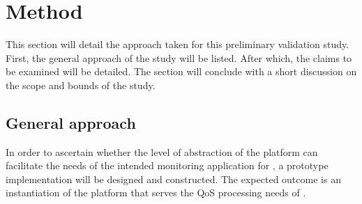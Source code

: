
	
\section{Method}
\label{sec:val:method}
This section will detail the approach taken for this preliminary validation study. First, the general approach of the study will be listed. After which, the claims to be examined will be detailed. The section will conclude with a short discussion on the scope and bounds of the study.
\subsection{General approach} 
In order to ascertain whether the level of abstraction of the platform can facilitate the needs of the intended monitoring application for \sensitnospace, a prototype implementation will be designed and constructed. The expected outcome is an instantiation of the platform that serves the QoS processing needs of \idsystemsnospace. 

